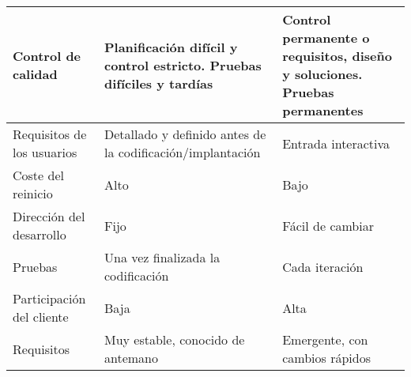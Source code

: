 \begin{longtable}{|p{3cm}|p{5cm}|p{5cm}|}
    Control de calidad                             & Planificación difícil y control estricto. Pruebas difíciles y tardías                                                              & Control permanente o requisitos, diseño y soluciones. Pruebas permanentes                                                                                                                           \\\hline
    Requisitos de los usuarios                     & Detallado y definido antes de la codificación/implantación                                                                         & Entrada interactiva                                                                                                                                                                                 \\\hline
    Coste del reinicio                             & Alto                                                                                                                               & Bajo                                                                                                                                                                                                \\\hline
    Dirección del desarrollo                       & Fijo                                                                                                                               & Fácil de cambiar                                                                                                                                                                                    \\\hline
    Pruebas                                        & Una vez finalizada la codificación                                                                                                 & Cada iteración                                                                                                                                                                                      \\\hline
    Participación del cliente                      & Baja                                                                                                                               & Alta                                                                                                                                                                                                \\\hline
    Requisitos                                     & Muy estable, conocido de antemano                                                                                                  & Emergente, con cambios rápidos                                                                                                                                                                      \\\hline

\end{longtable}
